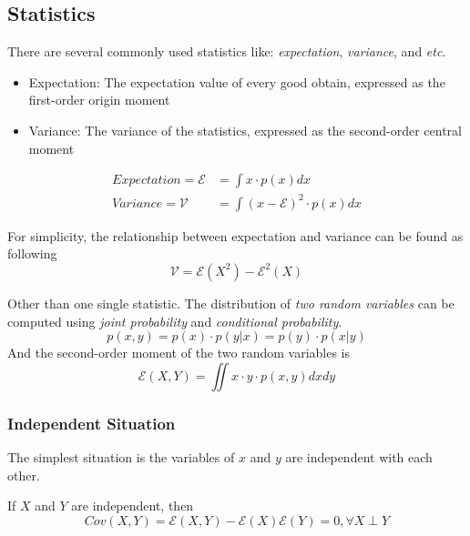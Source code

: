 \documentclass[./main.tex]{subfiles}
\begin{document}
\subsection{Statistics}
There are several commonly used statistics like: \emph{expectation}, \emph{variance}, and \textit{etc}.
\begin{itemize}
    \item Expectation: The expectation value of every good obtain, expressed as the first-order origin moment
    \item Variance: The variance of the statistics, expressed as the second-order central moment
\end{itemize}
\begin{equation}
    \label{Definition: Expectation and variance definition}
    \begin{split}
        Expectation = \mathcal{E} & = \int x \cdot p(x) dx                 \\
        Variance = \mathcal{V}    & = \int (x-\mathcal{E})^2 \cdot p(x) dx
    \end{split}
\end{equation}
\begin{lemma}
    \label{Lemma: Relationship between expectation and variance}
    For simplicity, the relationship between expectation and variance can be found as following
    \begin{equation*}
        \mathcal{V} = \mathcal{E}(X^2) - \mathcal{E}^2(X)
    \end{equation*}
\end{lemma}

Other than one single statistic.
The distribution of \emph{two random variables} can be computed using \emph{joint probability} and \emph{conditional probability}.
\begin{equation*}
    p(x, y) = p(x) \cdot p(y|x) = p(y) \cdot p(x|y)
\end{equation*}
And the second-order moment of the two random variables is
\begin{equation*}
    \mathcal{E}(X, Y) = \iint x \cdot y \cdot p(x, y) dx dy
\end{equation*}

\subsubsection{Independent Situation}

The simplest situation is the variables of $x$ and $y$ are independent with each other.
\begin{lemma}
    \label{Lemma: Second-order mixing moment of independent variables}
    If $X$ and $Y$ are independent, then
    \begin{equation*}
        Cov(X, Y) =
        \mathcal{E}(X, Y) - \mathcal{E}(X) \mathcal{E}(Y) = 0,
        \forall X \perp Y
    \end{equation*}
\end{lemma}
\end{document}
